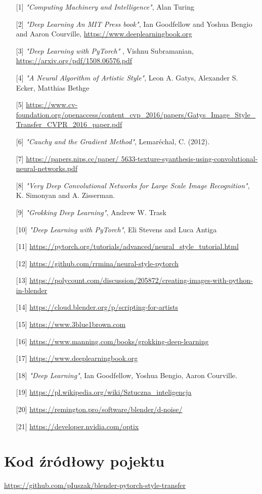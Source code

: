 \documentclass[openright]{xmgr}
\begin{document}
\begin{itemize}
\item [{[1]}] \textit{"Computing Machinery and Intelligence"},  Alan Turing
\item [{[2]}] \textit{"Deep Learning An MIT Press book"},  Ian Goodfellow and Yoshua Bengio and Aaron Courville,  \url{https://www.deeplearningbook.org}
\item [{[3]}] \textit{"Deep Learning with PyTorch"} , Vishnu Subramanian, \url{https://arxiv.org/pdf/1508.06576.pdf}
\item [{[4]}] \textit{"A Neural Algorithm of Artistic Style"},   Leon A. Gatys,  Alexander S. Ecker,  Matthias Bethge
\item [{[5]}] \url{https://www.cv-foundation.org/openaccess/content_cvp_2016/papers/Gatys_Image_Style_Transfer_CVPR_2016_paper.pdf}
\item [{[6]}] \textit{"Cauchy and the Gradient Method"},  Lemaréchal,  C. (2012). 
\item [{[7]}] \url{https://papers.nips.cc/paper/
5633-texture-syanthesis-using-convolutional-neural-networks.pdf}
\item[{[8]}] \textit{"Very Deep Convolutional Networks for Large Scale Image Recognition"},  K. Simonyan and A.  Zisserman. 
\item [{[9]}] \textit{"Grokking Deep Learning"},  Andrew W. Trask
\item [{[10]}] \textit{"Deep Learning with PyTorch"}, Eli Stevens and Luca Antiga
\item [{[11]}] \url{https://pytorch.org/tutorials/advanced/neural_style_tutorial.html}
\item [{[12]}] \url{https://github.com/rrmina/neural-style-pytorch}
\item [{[13]}] \url{https://polycount.com/discussion/205872/creating-images-with-python-in-blender}
\item [{[14]}] \url{https://cloud.blender.org/p/scripting-for-artists}
\item [{[15]}] \url{https://www.3blue1brown.com}
\item [{[16]}] \url{https://www.manning.com/books/grokking-deep-learning}
\item [{[17]}]\url{https://www.deeplearningbook.org}
\item [{[18]}] \textit{"Deep Learning"},  Ian Goodfellow, Yoshua Bengio,  Aaron Courville.
\item [{[19]}]\url{https://pl.wikipedia.org/wiki/Sztuczna_inteligencja}
\item [{[20]}]\url{https://remington.pro/software/blender/d-noise/}
\item [{[21]}]\url{https://developer.nvidia.com/optix}


\end{itemize}


\appendix
\chapter{Kod źródłowy pojektu}

\url{https://github.com/pIuszak/blender-pytorch-style-transfer}



\end{document}
